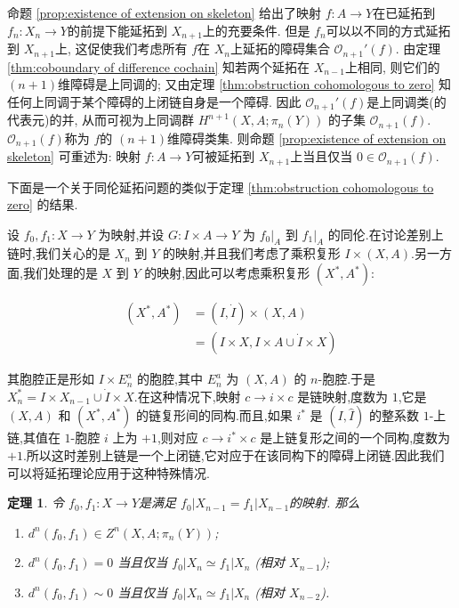\documentclass{ctexart}
\theoremstyle{plain}
\newtheorem{theorem}{定理}[section]
\theoremstyle{definition}
\begin{document}
            命题 \ref{prop:existence of extension on skeleton} 给出了映射 $f:A\to Y$在已延拓到 $f_{n}:X_{n}\to Y$的前提下能延拓到 $X_{n+1}$上的充要条件. 但是 $f_{n}$可以以不同的方式延拓到 $X_{n+1}$上, 这促使我们考虑所有 $f$在 $X_{n}$上延拓的障碍集合 $\mathcal{O}_{n+1}'(f)$. 由定理 \ref{thm:coboundary of difference cochain} 知若两个延拓在 $X_{n-1}$上相同, 则它们的 $(n+1)$维障碍是上同调的; 又由定理 \ref{thm:obstruction cohomologous to zero} 知任何上同调于某个障碍的上闭链自身是一个障碍. 因此 $\mathcal{O}_{n+1}'(f)$是上同调类(的代表元)的并, 从而可视为上同调群 $H^{n+1}(X,A;\pi_{n}(Y))$ 的子集 $\mathcal{O}_{n+1}(f)$. $\mathcal{O}_{n+1}(f)$称为 $f$的 $(n+1)$维障碍类集. 则命题 \ref{prop:existence of extension on skeleton} 可重述为: 映射 $f:A\to Y$可被延拓到 $X_{n+1}$上当且仅当 $0 \in \mathcal{O}_{n+1}(f)$.

            下面是一个关于同伦延拓问题的类似于定理 \ref{thm:obstruction cohomologous to zero} 的结果.

            设 $f_0, f_1: X \to Y$ 为映射,并设 $G: I \times A \to Y$ 为 $f_0|_A$ 到 $f_1|_A$ 的同伦.在讨论差别上链时,我们关心的是 $X_n$ 到 $Y$ 的映射,并且我们考虑了乘积复形 $I \times (X, A)$.另一方面,我们处理的是 $X$ 到 $Y$ 的映射,因此可以考虑乘积复形 $(X^*, A^*)$: 

            \begin{equation*}
              \begin{aligned}
                (X^*, A^*) &= (I, \dot{I}) \times (X, A)\\
                &=(I \times X, I \times A \cup \dot{I} \times X)
              \end{aligned}
            \end{equation*}

            其胞腔正是形如 $I \times E_n^a$ 的胞腔,其中 $E_n^a$ 为 $(X, A)$ 的 $n$-胞腔.于是 $X_n^* = I \times X_{n-1} \cup \dot{I} \times X$.在这种情况下,映射 $c \to i \times c$ 是链映射,度数为 $1$,它是 $(X, A)$ 和 $(X^*, A^*)$ 的链复形间的同构.而且,如果 $i^*$ 是 $(I, \hat{I})$ 的整系数 $1$-上链,其值在 $1$-胞腔 $i$ 上为 $+1$,则对应 $c \to i^* \times c$ 是上链复形之间的一个同构,度数为 $+1$.所以这时差别上链是一个上闭链,它对应于在该同构下的障碍上闭链.因此我们可以将延拓理论应用于这种特殊情况.

            \begin{theorem}
                \label{thm:5.15}
                令 $f_0,f_1:X\to Y$是满足 $f_0|X_{n-1}=f_1|X_{n-1}$的映射. 那么 
                \begin{enumerate}
                    \item $d^{n}(f_0,f_1) \in Z^{n}(X,A;\pi_{n}(Y))$;
                    \item $d^{n}(f_0,f_1)=0$ 当且仅当 $f_0|X_{n}\simeq f_1|X_{n}$ (相对 $X_{n-1}$);
                    \item $d^{n}(f_0,f_1)\sim 0$ 当且仅当 $f_0|X_{n}\simeq f_1|X_{n}$ (相对 $X_{n-2}$).
                \end{enumerate}
            \end{theorem}
\end{document}
